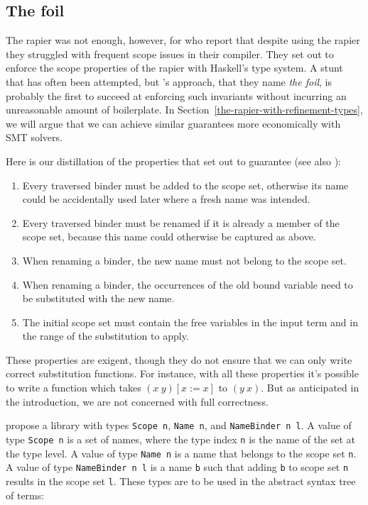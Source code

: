 \documentclass[sigconf]{acmart}
\newcommand{\tc}[1]{{\small\texttt{#1}}}
\begin{document}
\subsection{The foil}
\label{the-rapier-with-stronger-types}

The rapier was not enough, however, for \citet{maclaurin23} who report that
despite using the rapier they struggled with frequent scope issues in their
compiler. They set out to enforce the scope properties of the rapier with
Haskell's type system. A stunt that has often been attempted, but
\citeauthor{maclaurin23}'s approach, that they name \emph{the foil}, is probably the
first to succeed at enforcing such invariants without incurring an unreasonable
amount of boilerplate.
In Section~\ref{the-rapier-with-refinement-types}, we will argue that we can
achieve similar guarantees more economically with SMT solvers.

Here is our distillation of the properties that \citeauthor{maclaurin23} set
out to guarantee (see also \cite[Section~4]{maclaurin23}):
\begin{enumerate}
\item Every traversed binder must be added to the scope set, otherwise its name
      could be accidentally used later where a fresh name was intended.
\item \label{req:always-rename} Every traversed binder must be renamed if it is already a member of the
      scope set, because this name could otherwise be captured as above.
\item When renaming a binder, the new name must not belong to the scope set.
\item When renaming a binder, the occurrences of the old bound variable need
      to be substituted with the new name.
\item The initial scope set must contain the free variables in the input term
      and in the range of the substitution to apply.
\end{enumerate}

These properties are exigent, though they do not ensure that we can only write correct
substitution functions. For instance, with all these properties it's possible
to write a function which takes $(x\ y)[x:=x]$ to $(y\ x)$.
But as anticipated in the
introduction, we are not concerned with full correctness.

 propose a library with types \tc{Scope n}, \tc{Name n}, and
\tc{Name\-Binder n l}. A value of type \tc{Scope n} is a set of names, where
the type index \tc{n} is the name of the set at the type level. A value of type \tc{Name n} is a name that
belongs to the scope set \tc{n}. A value of type \tc{NameBinder n l} is
a name \tc{b} such that adding \tc{b} to scope set \tc{n} results in the scope
set \tc{l}.
These types are to be used in
the abstract syntax tree of terms:
\end{document}
